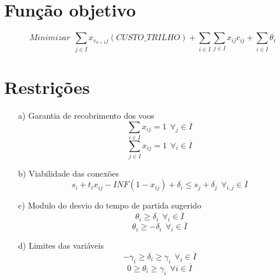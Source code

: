 \section{Função objetivo}

\begin{equation}
Minimizar \  \ \sum_{j \in \overline{I}} x_{v_{n+1}j}(CUSTO\_TRILHO) + \sum_{i \in
\overline{I}} \sum_{j \in I} x_{ij}c_{ij} + \sum_{i \in
\overline{I}} \theta_{i}
\end{equation}

\section{Restrições}

\begin{enumerate}


\item[a)] Garantia de recobrimento dos voos \\
\begin{equation}
  \sum_{i \in I} x_{ij}= 1 \   \ \forall_{j} \in \overline{I} 
\end{equation}
\begin{equation}
\sum_{j \in I} x_{ij} = 1 \   \ \forall_{i} \in \overline{I}
\end{equation}





\item[b)] Viabilidade das conexões \\
\begin{equation}
s_{i} + t_{i}x_{ij} - INF(1 - x_{ij}) + \delta_{i} \leq s_{j} + \delta_{j} \   \ \forall_{i,j} \in \overline{I}
\end{equation}

\item[c)] Modulo do desvio do tempo de partida sugerido \\
\begin{equation}
\theta_{i} \geq \delta_{i} \   \ \forall_{i} \in \overline{I}
\end{equation}
\begin{equation}
\theta_{i} \geq -\delta_{i} \   \ \forall_{i} \in \overline{I}
\end{equation}

\item[d)] Limites das variáveis \\
\begin{equation}
-\gamma_{i} \geq \delta_{i} \geq \gamma_{i} \   \ \forall_{i} \in \overline{I}
\end{equation}
\begin{equation}
0 \geq \theta_{i} \geq \gamma_{i} \   \ \forall{i} \in \overline{I}
\end{equation}
\end{enumerate}

